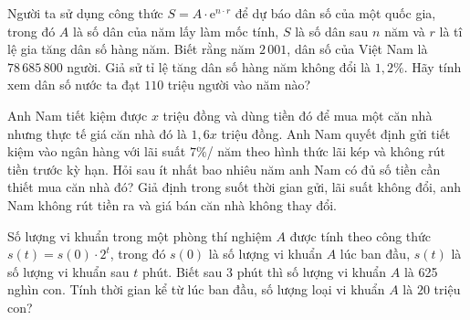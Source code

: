 \begin{ex}%
	Người ta sử dụng công thức $S=A\cdot \mathrm{e}^{n\cdot r}$ để dự báo dân số của một quốc gia, trong đó $A$ là số dân của năm lấy làm mốc tính, $S$ là số dân sau $n$ năm và $r$ là tî lệ gia  tăng dân số hàng năm. Biết rằng năm $2\,001$, dân số của Việt Nam là $78\,685\,800$ người. Giả sử tỉ lệ tăng dân số hàng năm không đổi là $1{,}2\%$. Hãy tính xem dân số nước ta đạt $110$ triệu người vào năm nào?
\end{ex}

\begin{ex}%
	Anh Nam tiết kiệm được $x$ triệu đồng và dùng tiền đó để mua một căn nhà nhưng thực tế giá căn nhà đó là $1{,}6x$ triệu đồng. Anh Nam quyết định gửi tiết kiệm vào ngân hàng với lãi suất $7\% $/ năm theo hình thức lãi kép và không rút tiền trước kỳ hạn. Hỏi sau ít nhất bao nhiêu năm anh Nam có đủ số tiền cần thiết mua căn nhà  đó? Giả định trong suốt thời gian gửi, lãi suất không đổi, anh Nam không rút tiền ra và giá bán căn nhà không thay đổi.
\end{ex}

\begin{ex}%
	Số lượng vi khuẩn  trong một phòng thí nghiệm $A$ được tính theo công thức $s(t)=s(0)\cdot 2^t$, trong đó $s(0)$ là số lượng vi khuẩn $A$ lúc ban đầu, $s(t)$ là số lượng vi khuẩn sau $t$ phút. Biết sau $3$ phút thì số lượng vi khuẩn $A$ là 625 nghìn con. Tính thời gian kể từ lúc ban đầu, số lượng loại vi khuẩn $A$ là $20$ triệu con?
\end{ex}

